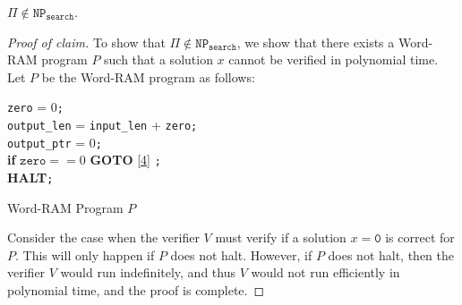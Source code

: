 \documentclass[11pt]{scrartcl}
\theoremstyle{dotlessP}
\theoremstyle{dotlessN}
\newcommand{\np}{\texttt{NP}_\texttt{search}}
\begin{document}
\begin{claim*}
	$\Pi \not\in \np$. 
\end{claim*}
\begin{proof}
	[Proof of claim]
	To show that $\Pi \not\in \np$, we show that there exists a Word-RAM program $P$ such that a solution $x$ cannot be verified in polynomial time. Let $P$ be the Word-RAM program as follows:

\begin{algorithm}[H]                
		\texttt{zero} = 0\texttt{;} \\
		\texttt{output\_len} = \texttt{input\_len} + \texttt{zero}\texttt{;} \\
		\texttt{output\_ptr} = 0\texttt{;}\\
		\textbf{if} $\texttt{zero} == 0$ \textbf{GOTO} \ref{4} \label{4} \texttt{;}\\
		\textbf{HALT}\texttt{;}
		\caption{Word-RAM Program $P$}
\end{algorithm}
Consider the case when the verifier $V$ must verify if a solution $x = \texttt{0}$ is correct for $P$. This will only happen if $P$ does not halt. However, if $P$ does not halt, then the verifier $V$ would run indefinitely, and thus $V$ would not run efficiently in polynomial time, and the proof is complete.
\end{proof}
\end{document}
